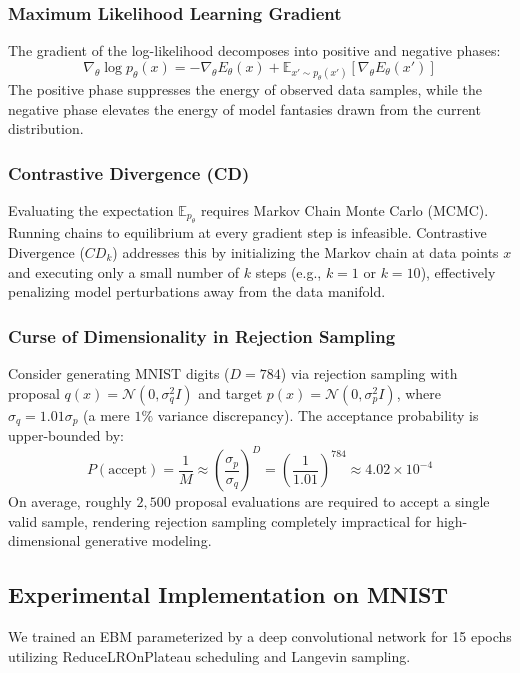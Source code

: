 \documentclass[10pt,journal,compsoc]{IEEEtran}
\begin{document}
\subsubsection{Maximum Likelihood Learning Gradient}
The gradient of the log-likelihood decomposes into positive and negative phases:
\begin{equation}
\nabla_\theta \log p_\theta(x) = -\nabla_\theta E_\theta(x) + \mathbb{E}_{x' \sim p_\theta(x')} [\nabla_\theta E_\theta(x')]
\end{equation}
The positive phase suppresses the energy of observed data samples, while the negative phase elevates the energy of model fantasies drawn from the current distribution.

\subsubsection{Contrastive Divergence (CD)}
Evaluating the expectation $\mathbb{E}_{p_\theta}$ requires Markov Chain Monte Carlo (MCMC). Running chains to equilibrium at every gradient step is infeasible. Contrastive Divergence ($CD_k$) addresses this by initializing the Markov chain at data points $x$ and executing only a small number of $k$ steps (e.g., $k=1$ or $k=10$), effectively penalizing model perturbations away from the data manifold.

\subsubsection{Curse of Dimensionality in Rejection Sampling}
Consider generating MNIST digits ($D = 784$) via rejection sampling with proposal $q(x) = \mathcal{N}(0, \sigma_q^2 I)$ and target $p(x) = \mathcal{N}(0, \sigma_p^2 I)$, where $\sigma_q = 1.01 \sigma_p$ (a mere $1\%$ variance discrepancy). The acceptance probability is upper-bounded by:
\begin{equation}
P(\text{accept}) = \frac{1}{M} \approx \left(\frac{\sigma_p}{\sigma_q}\right)^D = \left(\frac{1}{1.01}\right)^{784} \approx 4.02 \times 10^{-4}
\end{equation}
On average, roughly $2,500$ proposal evaluations are required to accept a single valid sample, rendering rejection sampling completely impractical for high-dimensional generative modeling.

\subsection{Experimental Implementation on MNIST}
We trained an EBM parameterized by a deep convolutional network for 15 epochs utilizing ReduceLROnPlateau scheduling and Langevin sampling.
\end{document}

